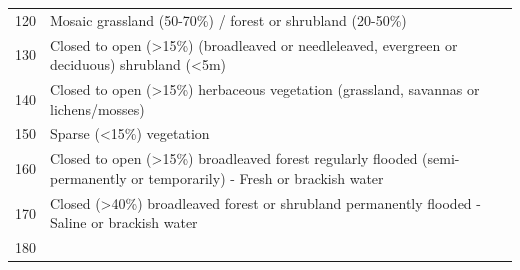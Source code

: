 \documentclass[11pt,]{article}
\begin{document}
\begin{longtable}[]{@{}ll@{}}
\begin{minipage}[t]{0.08\columnwidth}
120\strut
\end{minipage} & \begin{minipage}[t]{0.86\columnwidth}\raggedright\strut
Mosaic grassland (50-70\%) / forest or shrubland (20-50\%)\strut
\end{minipage}\tabularnewline
\begin{minipage}[t]{0.08\columnwidth}\raggedright\strut
130\strut
\end{minipage} & \begin{minipage}[t]{0.86\columnwidth}\raggedright\strut
Closed to open (\textgreater{}15\%) (broadleaved or needleleaved,
evergreen or deciduous) shrubland (\textless{}5m)\strut
\end{minipage}\tabularnewline
\begin{minipage}[t]{0.08\columnwidth}\raggedright\strut
140\strut
\end{minipage} & \begin{minipage}[t]{0.86\columnwidth}\raggedright\strut
Closed to open (\textgreater{}15\%) herbaceous vegetation (grassland,
savannas or lichens/mosses)\strut
\end{minipage}\tabularnewline
\begin{minipage}[t]{0.08\columnwidth}\raggedright\strut
150\strut
\end{minipage} & \begin{minipage}[t]{0.86\columnwidth}\raggedright\strut
Sparse (\textless{}15\%) vegetation\strut
\end{minipage}\tabularnewline
\begin{minipage}[t]{0.08\columnwidth}\raggedright\strut
160\strut
\end{minipage} & \begin{minipage}[t]{0.86\columnwidth}\raggedright\strut
Closed to open (\textgreater{}15\%) broadleaved forest regularly flooded
(semi-permanently or temporarily) - Fresh or brackish water\strut
\end{minipage}\tabularnewline
\begin{minipage}[t]{0.08\columnwidth}\raggedright\strut
170\strut
\end{minipage} & \begin{minipage}[t]{0.86\columnwidth}\raggedright\strut
Closed (\textgreater{}40\%) broadleaved forest or shrubland permanently
flooded - Saline or brackish water\strut
\end{minipage}\tabularnewline
\begin{minipage}[t]{0.08\columnwidth}\raggedright\strut
180\strut
\end{minipage} & \begin{minipage}[t]{0.86\columnwidth}\raggedright\strut

\end{minipage}
\end{longtable}
\end{document}

